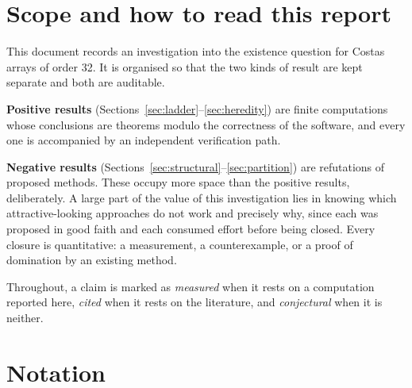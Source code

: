 \documentclass[11pt,a4paper]{article}
\theoremstyle{definition}
\begin{document}
\section{Scope and how to read this report}
\label{sec:scope}

This document records an investigation into the existence question for Costas
arrays of order 32. It is organised so that the two kinds of result are kept
separate and both are auditable.

\textbf{Positive results} (Sections~\ref{sec:ladder}--\ref{sec:heredity}) are
finite computations whose conclusions are theorems modulo the correctness of the
software, and every one is accompanied by an independent verification path.

\textbf{Negative results} (Sections~\ref{sec:structural}--\ref{sec:partition})
are refutations of proposed methods. These occupy more space than the positive
results, deliberately. A large part of the value of this investigation lies in
knowing which attractive-looking approaches do not work and precisely why, since
each was proposed in good faith and each consumed effort before being closed.
Every closure is quantitative: a measurement, a counterexample, or a proof of
domination by an existing method.

Throughout, a claim is marked as \emph{measured} when it rests on a computation
reported here, \emph{cited} when it rests on the literature, and
\emph{conjectural} when it is neither.

\section{Notation}
\label{sec:notation}
\end{document}
